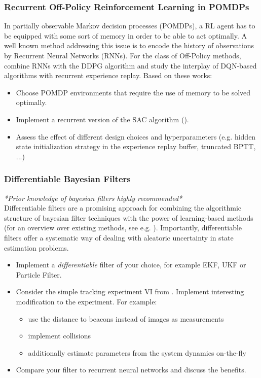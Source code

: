 \documentclass[a4paper]{article}
\begin{document}
\subsubsection{Recurrent Off-Policy Reinforcement Learning in POMDPs}
In partially observable Markov decision processes (POMDPs), a RL agent has to be equipped with some sort of memory in order to be able to act optimally. A well known method addressing this issue is to encode the history of observations by Recurrent Neural Networks (RNNs).
For the class of Off-Policy methods, \cite{heess2015memory} combine RNNs with the DDPG algorithm and \cite{kapturowski2018recurrent} study the interplay of DQN-based algorithms with recurrent experience replay.
Based on these works:
\begin{itemize}
  \item Choose POMDP environments that require the use of memory to be solved optimally.
  \item Implement a recurrent version of the SAC algorithm (\cite{Haarnoja2018a}).
  \item Assess the effect of different design choices and hyperparameters (e.g. hidden state initialization strategy in the experience replay buffer, truncated BPTT, ...)
\end{itemize}

\subsubsection{Differentiable Bayesian Filters}
\textit{*Prior knowledge of bayesian filters highly recommended*}\\
Differentiable filters are a promising approach for combining the algorithmic structure of bayesian filter techniques with the power of learning-based methods (for an overview over existing methods, see e.g. \cite{kloss2021train}). Importantly, differentiable filters offer a systematic way of dealing with aleatoric uncertainty in state estimation problems.
\begin{itemize}
  \item Implement a \textit{differentiable} filter of your choice, for example EKF, UKF or Particle Filter.
  \item Consider the simple tracking experiment VI from \cite{kloss2021train}. Implement interesting modification to the experiment. For example:
        \begin{itemize}
          \item use the distance to beacons instead of images as measurements
          \item implement collisions
          \item additionally estimate parameters from the system dynamics on-the-fly
        \end{itemize}
  \item Compare your filter to recurrent neural networks and discuss the benefits.
\end{itemize}
\end{document}
